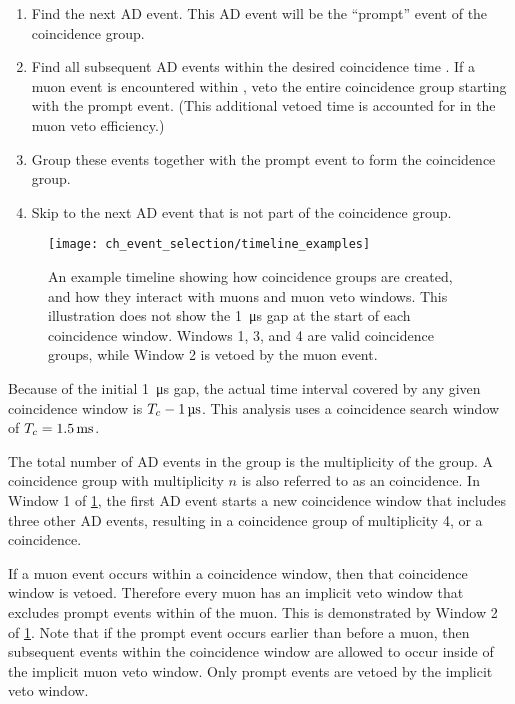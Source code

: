 \begin{enumerate}
    \item Find the next AD event.
        This AD event will be the ``prompt'' event of the coincidence group.
    \item Find all subsequent AD events within the desired coincidence time \tc.
        If a muon event is encountered within \tc,
        veto the entire coincidence group starting with the prompt event.
        (This additional vetoed time is accounted for in the muon veto efficiency.)
    \item Group these events together with the prompt event
        to form the coincidence group.
    \item Skip to the next AD event that is not part of the coincidence group.
\end{enumerate}

\begin{figure}
    \texttt{[image: ch\_event\_selection/timeline\_examples]}
    \caption{
        An example timeline showing how coincidence groups are created,
        and how they interact with muons and muon veto windows.
        This illustration does not show the \SI{1}{\micro\second} gap
        at the start of each coincidence window.
        Windows 1, 3, and 4 are valid coincidence groups,
        while Window 2 is vetoed by the muon event.
    }
    \label{fig:timeline_examples}
\end{figure}

Because of the initial \SI{1}{\micro\second} gap,
the actual time interval covered by any given coincidence window is
$T_c - \SI{1}{\micro\second}$.
This analysis uses a coincidence search window of $T_c = \SI{1.5}{\milli\second}$.

The total number of AD events in the group
is the multiplicity of the group.
A coincidence group with multiplicity $n$ is also referred to
as an  coincidence.
In Window 1 of \cref{fig:timeline_examples},
the first AD event starts a new coincidence window
that includes three other AD events,
resulting in a coincidence group of multiplicity 4, or a  coincidence.

If a muon event occurs within a coincidence window,
then that coincidence window is vetoed.
Therefore every muon has an implicit veto window
that excludes prompt events within \tc{} of the muon.
This is demonstrated by Window 2 of \cref{fig:timeline_examples}.
Note that if the prompt event occurs earlier than \tc{} before a muon,
then subsequent events within the coincidence window
are allowed to occur inside of the implicit muon veto window.
Only prompt events are vetoed by the implicit veto window.

